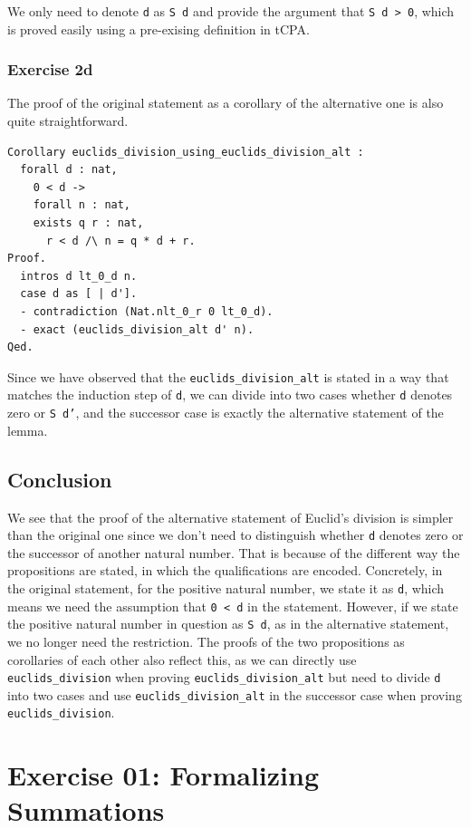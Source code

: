 \documentclass{article}
\begin{document}
We only need to denote \texttt{d} as \texttt{S d} and provide the argument that \texttt{S d > 0}, which is proved easily using a pre-exising definition in tCPA.

\subsubsection{Exercise 2d}
The proof of the original statement as a corollary of the alternative one is also quite straightforward.

\begin{lstlisting}
Corollary euclids_division_using_euclids_division_alt :
  forall d : nat,
    0 < d ->
    forall n : nat,
    exists q r : nat,
      r < d /\ n = q * d + r.
Proof.
  intros d lt_0_d n.
  case d as [ | d'].
  - contradiction (Nat.nlt_0_r 0 lt_0_d).
  - exact (euclids_division_alt d' n).
Qed.
\end{lstlisting}

Since we have observed that the \texttt{euclids\_division\_alt} is stated in a way that matches the induction step of \texttt{d}, we can divide into two cases whether \texttt{d} denotes zero or \texttt{S d'}, and the successor case is exactly the alternative statement of the lemma.

\subsection{Conclusion}
We see that the proof of the alternative statement of Euclid's division is simpler than the original one since we don't need to distinguish whether \texttt{d} denotes zero or the successor of another natural number. That is because of the different way the propositions are stated, in which the qualifications are encoded. Concretely, in the original statement, for the positive natural number, we state it as \texttt{d}, which means we need the assumption that \texttt{0 < d} in the statement. However, if we state the positive natural number in question as \texttt{S d}, as in the alternative statement, we no longer need the restriction. The proofs of the two propositions as corollaries of each other also reflect this, as we can directly use \texttt{euclids\_division} when proving \texttt{euclids\_division\_alt} but need to divide \texttt{d} into two cases and use \texttt{euclids\_division\_alt} in the successor case when proving \texttt{euclids\_division}.

\newpage

\section{Exercise 01: Formalizing Summations}
\end{document}
